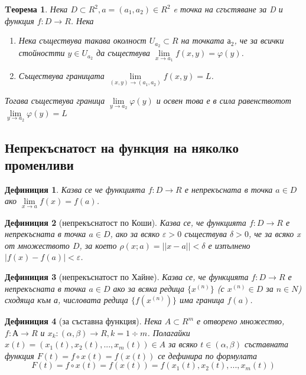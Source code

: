 \documentclass[fleqn]{article}
\newtheorem{theorem}{Tеорема}[subsection]
\newtheorem{definition}{Дефиниция}[subsection]
\begin{document}
	\begin{theorem}
Нека $D \subset R^2, a = (a_1, a_2) \in R^2$ e точка на сгъстяване за D и функция $f: D \rightarrow R$.  Нека
	\begin{enumerate}
		\item  Нека съществува такава околност $U_{a_2} \subset R$ на точката $а_2$, че за всички стойностти $y \in U_{a_2} $ да съществува  $\lim\limits_{x \rightarrow a_1} f(x,y) = \varphi (y)$.

		\item Съществува границата $\lim\limits_{(x, y) \rightarrow (a_1,a_2) } f(x,y) = L$.
	\end{enumerate}
Тогава съществува граница  $\lim\limits_{y \rightarrow a_2} \varphi (y)$ и освен това е в сила равенствотот  $\lim\limits_{y \rightarrow a_2} \varphi (y) = L$
	\end{theorem}

\subsection{Непрекъснатост на функция на няколко променливи}
	\begin{definition}
Казва се че функцията $f: D \rightarrow R$ е непрекъсната в точка $a \in D$ ако $\lim\limits_{x \rightarrow a} f(x) = f(a)$.
	\end{definition}

	\begin{definition}[непрекъснатост по Коши]
Казва се, че функцията $f: D \rightarrow R$ е непрекъсната в точка $a \in D$, ако за всяко $\varepsilon > 0$ съществува $\delta > 0$, че за всяко x от множеството $D $, за което $\rho(x;a) = || x - a || < \delta $ е изпълнено $|f(x) - f(a) | < \varepsilon$.
	\end{definition}

	\begin{definition}[непрекъснатост по Хайне]
Казва се, че функцията $f: D \rightarrow R$ е непрекъсната в точка $a \in D$ ако за всяка редица  $\{x^{(n)}\}$ (с $x^{(n)} \in D$ за $n \in N$) сходяща към а, числовата редица $\{f(x^{(n)})\}$ има граница $f(a)$. 
	\end{definition}

	\begin{definition}[за съставна функция]
Нека $A \subset R^m$ е отворено множество, $f: А \rightarrow R$ и $x_k: (\alpha, \beta) \rightarrow R, k = 1 \div m$. Полагайки  $x(t) = (x_1(t), x_2(t), ... , x_m(t)) \in A$ за всяко $t \in (\alpha, \beta)$ съставната функция $F(t) = f \circ x(t) = f(x(t))$ се дефинира по формулата 
$$F(t) = f \circ x(t) = f(x(t)) = f(x_1(t), x_2(t), ... , x_m(t))$$
	\end{definition}
\end{document}
